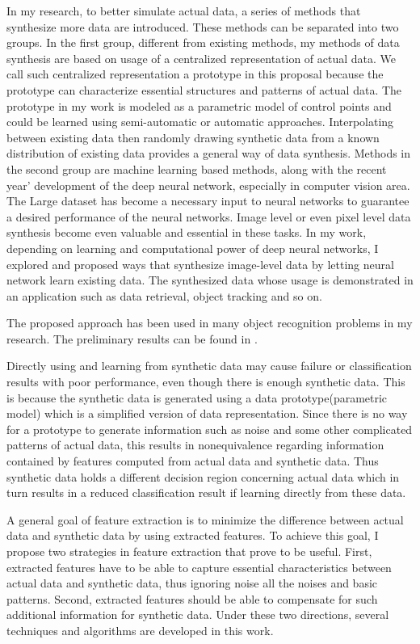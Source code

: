 \documentclass{iitthesis}
\begin{document}
In my research, to better simulate actual data, a series of methods that synthesize more data are introduced. These methods can be separated into two groups. In the first group, different from existing methods, my methods of data synthesis are based on usage of a centralized representation of actual data. We call such centralized representation a prototype in this proposal because the prototype can characterize essential structures and patterns of actual data. The prototype in my work is modeled as a parametric model of control points and could be learned using semi-automatic or automatic approaches. Interpolating between existing data then randomly drawing synthetic data from a known distribution of existing data provides a general way of data synthesis. Methods in the second group are machine learning based methods, along with the recent year' development of the deep neural network, especially in computer vision area. The Large dataset has become a necessary input to neural networks to guarantee a desired performance of the neural networks.  Image level or even pixel level data synthesis become even valuable and essential in these tasks. In my work, depending on learning and computational power of deep neural networks, I explored and proposed ways that synthesize image-level data by letting neural network learn existing data. The synthesized data whose usage is demonstrated in an application such as data retrieval, object tracking and so on.

The proposed approach has been used in many object recognition problems in my research. The preliminary results can be found in \cite{Zhang2014Autoencoder}\cite{AndiZang2015}\cite{ZX:14}.

 Directly using and learning from synthetic data may cause failure or classification results with poor performance, even though there is enough synthetic data. This is because the synthetic data is generated using a data prototype(parametric model) which is a simplified version of data representation. Since there is no way for a prototype to generate information such as noise and some other complicated patterns of actual data, this results in nonequivalence regarding information contained by features computed from actual data and synthetic data. Thus synthetic data holds a different decision region concerning actual data which in turn results in a reduced classification result if learning directly from these data. 

A general goal of feature extraction is to minimize the difference between actual data and synthetic data by using extracted features. To achieve this goal, I propose two strategies in feature extraction that prove to be useful. First, extracted features have to be able to capture essential characteristics between actual data and synthetic data, thus ignoring noise all the noises and basic patterns. Second, extracted features should be able to compensate for such additional information for synthetic data. Under these two directions, several techniques and algorithms are developed in this work.
\end{document}
